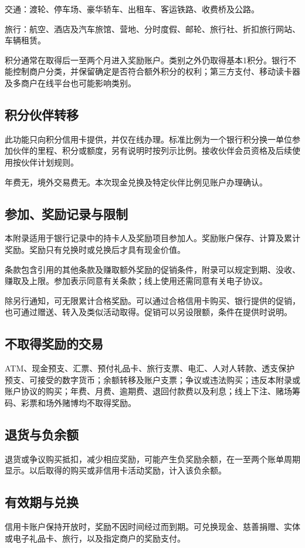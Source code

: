 \documentclass[UTF8,fontset=none,11pt,a4paper]{ctexart}
\begin{document}
交通：渡轮、停车场、豪华轿车、出租车、客运铁路、收费桥及公路。


旅行：航空、酒店及汽车旅馆、营地、分时度假、邮轮、旅行社、折扣旅行网站、车辆租赁。


积分通常在取得后一至两个月进入奖励账户。类别之外仍取得基本1积分。银行不能控制商户分类，并保留确定是否符合额外积分的权利；第三方支付、移动读卡器及多商户在线平台也可能影响类别。


\subsection*{积分伙伴转移}
此功能只向积分信用卡提供，并仅在线办理。标准比例为一个银行积分换一单位参加伙伴的里程、积分或额度，另有说明时按列示比例。接收伙伴会员资格及后续使用按伙伴计划规则。


年费无，境外交易费无。本次现金兑换及特定伙伴比例见账户办理确认。


\subsection*{参加、奖励记录与限制}
本附录适用于银行记录中的持卡人及奖励项目参加人。奖励账户保存、计算及累计奖励。奖励只有兑换时或兑换后才具有现金价值。


条款包含引用的其他条款及赚取额外奖励的促销条件，附录可以规定到期、没收、赚取及上限。参加表示同意有关条款；线上使用还需同意有关电子协议。


除另行通知，可无限累计合格奖励。可以通过合格信用卡购买、银行提供的促销，也可通过赠送、转入及类似活动取得。促销可以另设限额，条件在提供时说明。


\subsection*{不取得奖励的交易}
ATM、现金预支、汇票、预付礼品卡、旅行支票、电汇、人对人转款、透支保护预支、可接受的数字货币；余额转移及账户支票；争议或违法购买；违反本附录或账户协议的购买；年费、月费、逾期费、退回付款费以及利息；线上下注、赌场筹码、彩票和场外赌博均不取得奖励。


\subsection*{退货与负余额}
退货或争议购买抵扣，减少相应奖励，可能产生负奖励余额，在一至两个账单周期显示。以后取得的购买或非信用卡活动奖励，计入该负余额。


\subsection*{有效期与兑换}
信用卡账户保持开放时，奖励不因时间经过而到期。可兑换现金、慈善捐赠、实体或电子礼品卡、旅行，以及指定商户的奖励支付。
\end{document}
